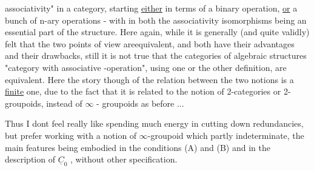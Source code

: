 associativity" in a category,  starting \uline{either} in terms of
a binary operation, \uline{or} a bunch of n-ary operations - with\hand{,} in both 
the associativity isomorphisms being an essential part of the structure.
Here again, while it is generally (and quite validly) felt that the
two points of view areequivalent, and both have their advantages and
their drawbacks, still it is not true that the  categories of algebraic
\margin{$\otimes$} structures "category with associative \hand{$\otimes$}-operation", using one or the
 other definition, are equivalent\hand{\unsure{*}}. Here the story though of the relation
between the two notions is a \uline{finite} one, due to the fact that it is
related to the notion of 2-categories or 2-groupoids, instead of $\infty$ -
groupoids as before ...

Thus I dont feel really like spending much energy in cutting down
redundancies, but prefer working with a notion of $\infty$-groupoid which 
partly indeterminate, the main features being embodied in the conditions
(A) and (B) and in the description of $\underline{C}_0$ , without other specification.

